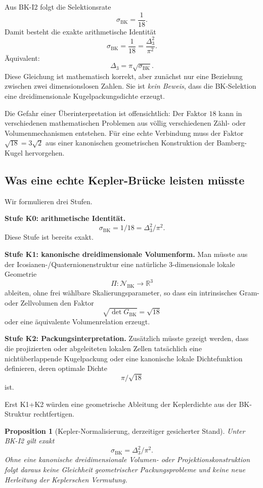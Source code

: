 \documentclass[11pt,a4paper]{article}
\newtheorem{proposition}[satz]{Proposition}
\theoremstyle{definition}
\newcommand{\R}{\mathbb R}
\newcommand{\BK}{\mathrm{BK}}
\begin{document}
Aus BK-I2 folgt die Selektionsrate
\[
\sigma_{\BK}=\frac1{18}.
\]
Damit besteht die exakte arithmetische Identität
\[
\boxed{
\sigma_{\BK}
=
\frac1{18}
=
\frac{\Delta_3^2}{\pi^2}.
}
\]
Äquivalent:
\[
\boxed{
\Delta_3=\pi\sqrt{\sigma_{\BK}}.
}
\]
Diese Gleichung ist mathematisch korrekt, aber zunächst nur eine Beziehung zwischen zwei dimensionslosen Zahlen. Sie ist \emph{kein Beweis}, dass die BK-Selektion eine dreidimensionale Kugelpackungsdichte erzeugt.

Die Gefahr einer Überinterpretation ist offensichtlich: Der Faktor \(18\) kann in verschiedenen mathematischen Problemen aus völlig verschiedenen Zähl- oder Volumenmechanismen entstehen. Für eine echte Verbindung muss der Faktor \(\sqrt{18}=3\sqrt2\) aus einer kanonischen geometrischen Konstruktion der Bamberg-Kugel hervorgehen.

\subsection{Was eine echte Kepler-Brücke leisten müsste}

Wir formulieren drei Stufen.

\textbf{Stufe K0: arithmetische Identität.}
\[
\sigma_{\BK}=1/18=\Delta_3^2/\pi^2.
\]
Diese Stufe ist bereits exakt.

\textbf{Stufe K1: kanonische dreidimensionale Volumenform.}
Man müsste aus der Icosianen-/Quaternionenstruktur eine natürliche 3-dimensionale lokale Geometrie
\[
\Pi:\mathcal N_{\BK}\longrightarrow\R^3
\]
ableiten, ohne frei wählbare Skalierungsparameter, so dass ein intrinsisches Gram- oder Zellvolumen den Faktor
\[
\sqrt{\det G_{\BK}}=\sqrt{18}
\]
oder eine äquivalente Volumenrelation erzeugt.

\textbf{Stufe K2: Packungsinterpretation.}
Zusätzlich müsste gezeigt werden, dass die projizierten oder abgeleiteten lokalen Zellen tatsächlich eine nichtüberlappende Kugelpackung oder eine kanonische lokale Dichtefunktion definieren, deren optimale Dichte
\[
\pi/\sqrt{18}
\]
ist.

Erst K1+K2 würden eine geometrische Ableitung der Keplerdichte aus der BK-Struktur rechtfertigen.

\begin{proposition}[Kepler-Normalisierung, derzeitiger gesicherter Stand]
Unter BK-I2 gilt exakt
\[
\sigma_{\BK}=\Delta_3^2/\pi^2.
\]
Ohne eine kanonische dreidimensionale Volumen- oder Projektionskonstruktion folgt daraus keine Gleichheit geometrischer Packungsprobleme und keine neue Herleitung der Keplerschen Vermutung.
\end{proposition}
\end{document}
